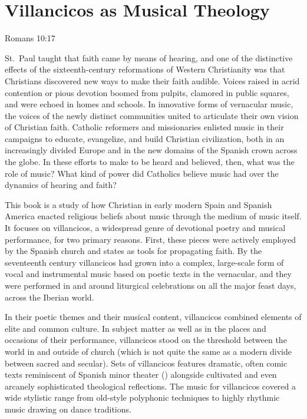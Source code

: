 %

\chapter{Villancicos as Musical Theology}

\epigraph
{}
{Romans 10:17}

St.~Paul taught that faith came by means of hearing, and one of the distinctive effects of the sixteenth-century reformations of Western Christianity was that Christians discovered new ways to make their faith audible.
Voices raised in acrid contention or pious devotion boomed from pulpits, clamored in public squares, and were echoed in homes and schools.
In innovative forms of vernacular music, the voices of the newly distinct communities united to articulate their own vision of Christian faith.
Catholic reformers and missionaries enlisted music in their campaigns to educate, evangelize, and build Christian civilization, both in an increasingly divided Europe and in the new domains of the Spanish crown across the globe.
In these efforts to make  to be heard and believed, then, what was the role of music?
What kind of power did Catholics believe music had over the dynamics of hearing and faith?

This book is a study of how Christian in early modern Spain and Spanish America enacted religious beliefs about music through the medium of music itself.
It focuses on villancicos, a widespread genre of devotional poetry and musical performance, for two primary reasons.
First, these pieces were actively employed by the Spanish church and states as tools for propagating faith.
By the seventeenth century villancicos had grown into a complex, large-scale form of vocal and instrumental music based on poetic texts in the vernacular, and they were performed in and around liturgical celebrations on all the major feast days, across the Iberian world.

In their poetic themes and their musical content, villancicos combined elements of elite and common culture.
In subject matter as well as in the places and occasions of their performance, villancicos stood on the threshold between the world in and outside of church (which is not quite the same as a modern divide between sacred and secular).
Sets of villancicos features dramatic, often comic texts reminiscent of Spanish minor theater () alongside cultivated and even arcanely sophisticated theological reflections.
The music for villancicos covered a wide stylistic range from old-style polyphonic techniques to highly rhythmic music drawing on dance traditions.


